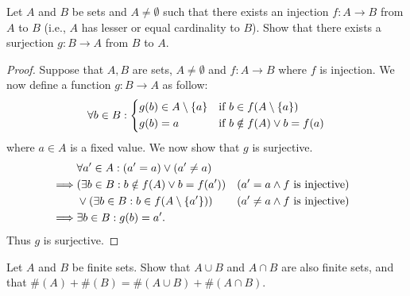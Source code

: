 \begin{ex}\label{ex:3.6.8}
	Let \(A\) and \(B\) be sets and \(A \neq \emptyset\) such that there exists an injection \(f : A \to B\) from \(A\) to \(B\) (i.e., \(A\) has lesser or equal cardinality to \(B\)).
	Show that there exists a surjection \(g : B \to A\) from \(B\) to \(A\).
\end{ex}

\begin{proof}
	Suppose that \(A, B\) are sets, \(A \neq \emptyset\) and \(f : A \to B\) where \(f\) is injection.
	We now define a function \(g : B \to A\) as follow:
	\[
		\forall b \in B : \begin{dcases}
			g(b) \in A \setminus \left\lbrace a\right\rbrace & \text{if } b \in f(A \setminus \left\lbrace a\right\rbrace) \\
			g(b) = a                     & \text{if } b \notin f(A) \lor b = f(a)
		\end{dcases}
	\]
	where \(a \in A\) is a fixed value.
	We now show that \(g\) is surjective.
	\begin{align*}
		         & \forall a' \in A : (a' = a) \lor (a' \neq a)                                                            \\
		\implies & (\exists b \in B : b \notin f(A) \lor b = f(a'))       &  & \text{(\(a' = a \land f\) is injective)}    \\
		         & \lor (\exists b \in B : b \in f(A \setminus \left\lbrace a'\right\rbrace)) &  & \text{(\(a' \neq a \land f\) is injective)} \\
		\implies & \exists b \in B : g(b) = a'.
	\end{align*}
	Thus \(g\) is surjective.
\end{proof}

\begin{ex}\label{ex:3.6.9}
	Let \(A\) and \(B\) be finite sets.
	Show that \(A \cup B\) and \(A \cap B\) are also finite sets, and that \(\#(A) + \#(B) = \#(A \cup B) + \#(A \cap B)\).
\end{ex}

